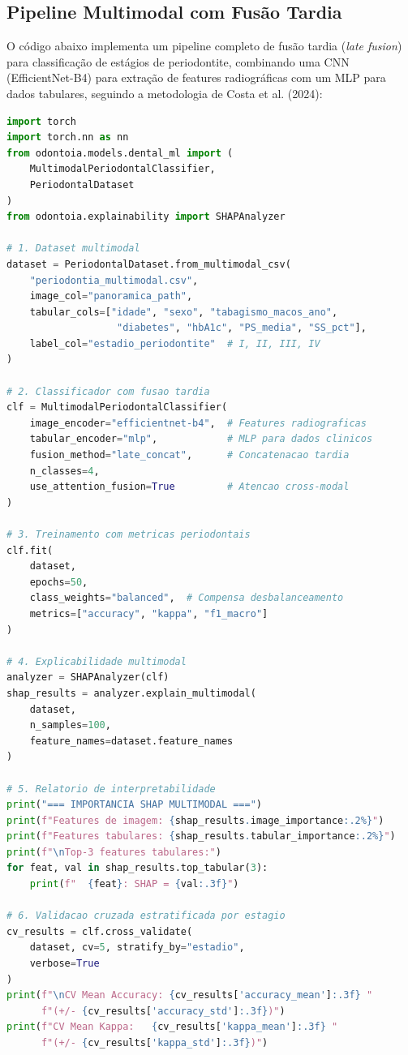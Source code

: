 \subsection{Pipeline Multimodal com Fusão Tardia}

O código abaixo implementa um pipeline completo de fusão tardia (\textit{late fusion}) para classificação de estágios de periodontite, combinando uma CNN (EfficientNet-B4) para extração de features radiográficas com um MLP para dados tabulares, seguindo a metodologia de Costa et al. (2024):

\begin{lstlisting}[language=Python, caption={Pipeline multimodal para classificação de periodontite com fusão tardia}]
import torch
import torch.nn as nn
from odontoia.models.dental_ml import (
    MultimodalPeriodontalClassifier,
    PeriodontalDataset
)
from odontoia.explainability import SHAPAnalyzer

# 1. Dataset multimodal
dataset = PeriodontalDataset.from_multimodal_csv(
    "periodontia_multimodal.csv",
    image_col="panoramica_path",
    tabular_cols=["idade", "sexo", "tabagismo_macos_ano", 
                   "diabetes", "hbA1c", "PS_media", "SS_pct"],
    label_col="estadio_periodontite"  # I, II, III, IV
)

# 2. Classificador com fusao tardia
clf = MultimodalPeriodontalClassifier(
    image_encoder="efficientnet-b4",  # Features radiograficas
    tabular_encoder="mlp",            # MLP para dados clinicos
    fusion_method="late_concat",      # Concatenacao tardia
    n_classes=4,
    use_attention_fusion=True         # Atencao cross-modal
)

# 3. Treinamento com metricas periodontais
clf.fit(
    dataset,
    epochs=50,
    class_weights="balanced",  # Compensa desbalanceamento
    metrics=["accuracy", "kappa", "f1_macro"]
)

# 4. Explicabilidade multimodal
analyzer = SHAPAnalyzer(clf)
shap_results = analyzer.explain_multimodal(
    dataset,
    n_samples=100,
    feature_names=dataset.feature_names
)

# 5. Relatorio de interpretabilidade
print("=== IMPORTANCIA SHAP MULTIMODAL ===")
print(f"Features de imagem: {shap_results.image_importance:.2%}")
print(f"Features tabulares: {shap_results.tabular_importance:.2%}")
print(f"\nTop-3 features tabulares:")
for feat, val in shap_results.top_tabular(3):
    print(f"  {feat}: SHAP = {val:.3f}")

# 6. Validacao cruzada estratificada por estagio
cv_results = clf.cross_validate(
    dataset, cv=5, stratify_by="estadio",
    verbose=True
)
print(f"\nCV Mean Accuracy: {cv_results['accuracy_mean']:.3f} "
      f"(+/- {cv_results['accuracy_std']:.3f})")
print(f"CV Mean Kappa:   {cv_results['kappa_mean']:.3f} "
      f"(+/- {cv_results['kappa_std']:.3f})")
\end{lstlisting}

